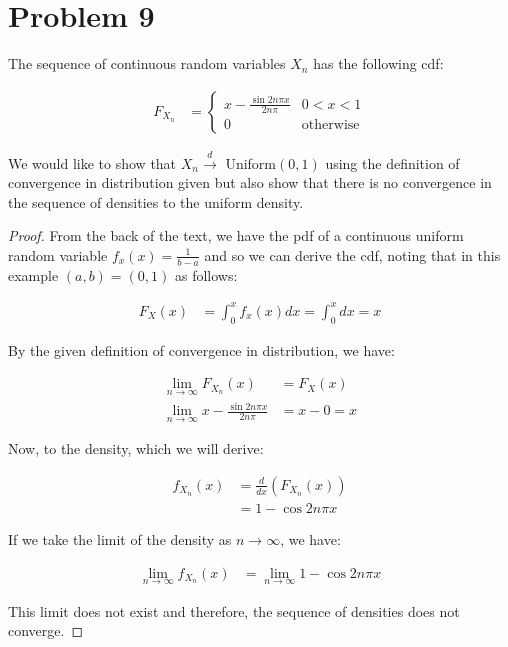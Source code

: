 \documentclass[11pt]{article}
\begin{document}
\section*{Problem 9}

The sequence of continuous random variables $X_n$ has the following cdf:

\begin{align*}
  F_{X_n} &= 
  \begin{cases}
    x - \frac{\sin{2n \pi x}}{2n\pi} & 0 < x < 1 \\
    0 & \text{otherwise}
  \end{cases}
\end{align*}

We would like to show that $X_n \xrightarrow{d}$ Uniform$(0,1)$ using the definition of convergence in distribution given but also show that there is no convergence in the sequence of densities to the uniform density.

\begin{proof}

From the back of the text, we have the pdf of a continuous uniform random variable $f_x(x) = \frac{1}{b-a}$ and so we can derive the cdf, noting that in this example $(a,b) = (0,1)$ as follows:

\begin{align*}
  F_X(x) &= \int_0^x f_x(x) dx = \int_0^x dx = x
\end{align*}

By the given definition of convergence in distribution, we have:

\begin{align*}
  \lim_{n \rightarrow \infty} F_{X_n}(x) &= F_X(x) \\
  \lim_{n \rightarrow \infty} x - \frac{\sin{2 n \pi x}}{2 n \pi} &= x - 0 = x
\end{align*}

Now, to the density, which we will derive:

\begin{align*}
  f_{X_n}(x) &= \frac{d}{dx} \left( F_{X_n} (x) \right) \\
  &= 1 - \cos{2 n \pi x}
\end{align*}

If we take the limit of the density as $n \rightarrow \infty$, we have:

\begin{align*}
  \lim_{n \rightarrow \infty} f_{X_n}(x) &= \lim_{n \rightarrow \infty} 1 - \cos{2 n \pi x}
\end{align*}

This limit does not exist and therefore, the sequence of densities does not converge.

\end{proof}
\end{document}
